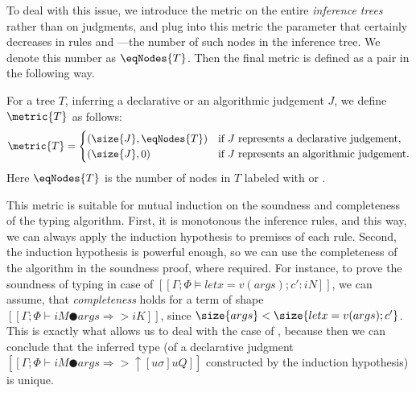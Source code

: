 To deal with this issue, we introduce the metric on the entire \emph{inference
trees} rather than on judgments, and plug into this metric the parameter that
certainly decreases in rules  and
---the number of such nodes in the inference
tree. We denote this number as $\eqNodes{T}$. Then the final metric is defined
as a pair in the following way.

\begin{definition*}
    For a tree $T$, inferring a declarative or an algorithmic judgement $J$, we define $\metric{T}$ as follows:
        \[
        \metric{T} = \begin{cases}
        (\size{J}, \eqNodes{T}) & \text{if } J \text{ represents a declarative judgement}, \\
        (\size{J}, 0) & \text{if } J \text{ represents an algorithmic judgement}.
        \end{cases}
        \]
    Here $\eqNodes{T}$ is the number of nodes in $T$ labeled with  or .
\end{definition*}

This metric is suitable for mutual induction on the soundness and completeness
of the typing algorithm.  First, it is monotonous \wrt the inference rules,
and this way, we can always apply the induction hypothesis to premises 
of each rule. Second, the induction hypothesis is powerful enough,
so we can use the completeness of the algorithm in the soundness proof,
where required. For instance, to prove the soundness
of typing in case of $[[Γ; Φ ⊨ let x = v(args); c' : iN]]$,
we can assume, that  \emph{completeness}
holds for a term of shape $[[Γ; Φ ⊢ iM ● args ⇒> iK ]]$, since
$\size{args} < \size{let x = v(args); c'}$.
This is exactly what allows us to 
deal with the case of ,
because then we can conclude that 
the inferred type (of a declarative judgment $[[Γ; Φ ⊢ iM ● args ⇒> ↑[uσ]uQ
]]$ constructed by the induction hypothesis) is unique.

